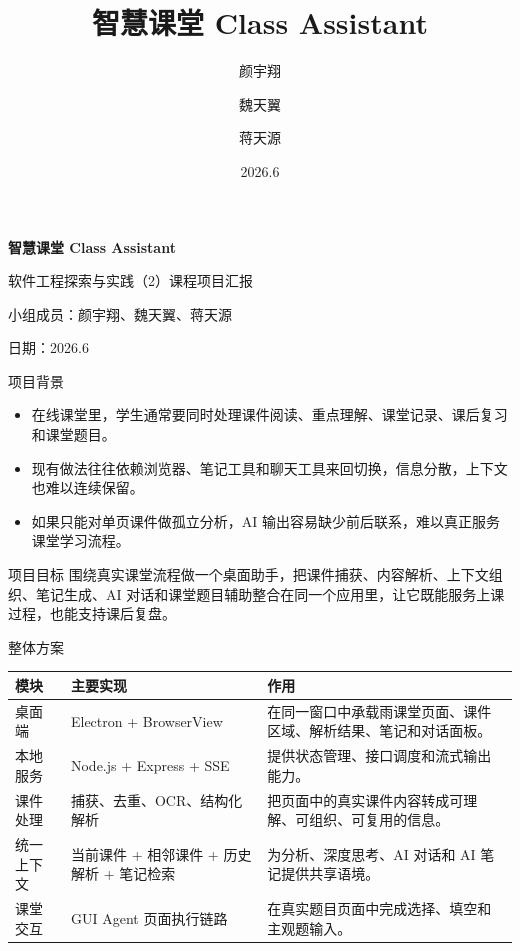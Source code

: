 \documentclass[11pt,aspectratio=169]{ctexbeamer}
\title{智慧课堂 Class Assistant}
\author{颜宇翔 \and 魏天翼 \and 蒋天源}
\date{2026.6}
\begin{document}
\begin{frame}[plain]
  \vspace*{2.1cm}
  {\centering
  {\color{DeepBlue}\bfseries\fontsize{29}{35}\selectfont 智慧课堂 Class Assistant\par}
  \vspace{0.7cm}
  {\color{Muted}\Large 软件工程探索与实践（2）课程项目汇报\par}
  \vspace{1.0cm}
  {\color{DeepBlue}\Large 小组成员：颜宇翔、魏天翼、蒋天源\par}
  \vspace{0.3cm}
  {\color{DeepBlue}\Large 日期：2026.6\par}
  }
\end{frame}

\begin{frame}[t]{项目背景}
\normalsize
\begin{itemize}
\item 在线课堂里，学生通常要同时处理课件阅读、重点理解、课堂记录、课后复习和课堂题目。
\item 现有做法往往依赖浏览器、笔记工具和聊天工具来回切换，信息分散，上下文也难以连续保留。
\item 如果只能对单页课件做孤立分析，AI 输出容易缺少前后联系，难以真正服务课堂学习流程。
\end{itemize}
\vspace{0.45em}
\begin{block}{项目目标}
围绕真实课堂流程做一个桌面助手，把课件捕获、内容解析、上下文组织、笔记生成、AI 对话和课堂题目辅助整合在同一个应用里，让它既能服务上课过程，也能支持课后复盘。
\end{block}
\end{frame}

\begin{frame}[t]{整体方案}
\small
\begin{tabularx}{\textwidth}{L{2.0cm} L{3.2cm} Y}
\toprule
模块 & 主要实现 & 作用 \\
\midrule
桌面端 & Electron + BrowserView & 在同一窗口中承载雨课堂页面、课件区域、解析结果、笔记和对话面板。 \\
本地服务 & Node.js + Express + SSE & 提供状态管理、接口调度和流式输出能力。 \\
课件处理 & 捕获、去重、OCR、结构化解析 & 把页面中的真实课件内容转成可理解、可组织、可复用的信息。 \\
统一上下文 & 当前课件 + 相邻课件 + 历史解析 + 笔记检索 & 为分析、深度思考、AI 对话和 AI 笔记提供共享语境。 \\
课堂交互 & GUI Agent 页面执行链路 & 在真实题目页面中完成选择、填空和主观题输入。 \\
\bottomrule
\end{tabularx}
\end{frame}
\end{document}
